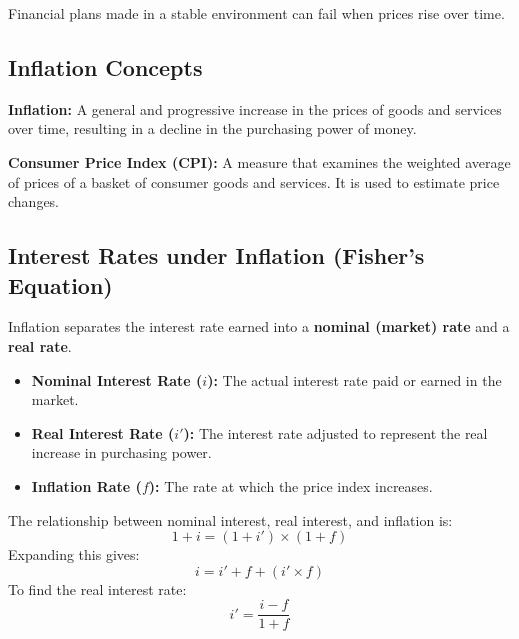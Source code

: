 \documentclass[12pt,a4paper]{article}
\begin{document}
Financial plans made in a stable environment can fail when prices rise over time.

\subsection{Inflation Concepts}
\begin{tcolorbox}[defbox]
\textbf{Inflation:} A general and progressive increase in the prices of goods and services over time, resulting in a decline in the purchasing power of money.
\par\vspace{3pt}
\textbf{Consumer Price Index (CPI):} A measure that examines the weighted average of prices of a basket of consumer goods and services. It is used to estimate price changes.
\end{tcolorbox}

\subsection{Interest Rates under Inflation (Fisher's Equation)}
Inflation separates the interest rate earned into a \textbf{nominal (market) rate} and a \textbf{real rate}.
\begin{itemize}[leftmargin=*, itemsep=4pt]
  \item \textbf{Nominal Interest Rate ($i$):} The actual interest rate paid or earned in the market.
  \item \textbf{Real Interest Rate ($i'$):} The interest rate adjusted to represent the real increase in purchasing power.
  \item \textbf{Inflation Rate ($f$):} The rate at which the price index increases.
\end{itemize}

\begin{tcolorbox}[formulabox, title={\textbf{Fisher's Equation}}]
The relationship between nominal interest, real interest, and inflation is:
\begin{equation}
  1 + i = (1 + i') \times (1 + f)
\end{equation}
Expanding this gives:
\begin{equation}
  i = i' + f + (i' \times f)
\end{equation}
To find the real interest rate:
\begin{equation}
  i' = \frac{i - f}{1 + f}
\end{equation}
\end{tcolorbox}
\end{document}
